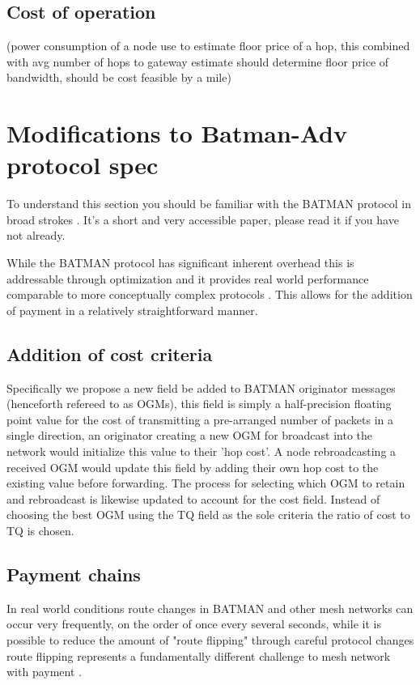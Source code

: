 \documentclass[11pt]{article}
\begin{document}
    \subsection{Cost of operation}

    (power consumption of a node use to estimate floor price of a hop, this combined with avg number of hops to gateway estimate should determine floor price of bandwidth, should be cost feasible by a mile)

\section{Modifications to Batman-Adv protocol spec}

	To understand this section you should be familiar with the BATMAN protocol in broad strokes \cite{batman}. It's a short and very accessible paper, please read it if you have not already.

	While the BATMAN protocol has significant inherent overhead this is addressable through optimization \cite{catwoman, batroam} and it provides real world performance comparable to more conceptually complex protocols \cite{meshperf}. This allows for the addition of payment in a relatively straightforward manner.

	\subsection{Addition of cost criteria}

		Specifically we propose a new field be added to BATMAN originator messages (henceforth refereed to as OGMs), this field is simply a half-precision floating point value for the cost of transmitting a pre-arranged number of packets in a single direction, an originator creating a new OGM for broadcast into the network would initialize this value to their 'hop cost'. A node rebroadcasting a received OGM would update this field by adding their own hop cost to the existing value before forwarding.
	The process for selecting which OGM to retain and rebroadcast is likewise updated to account for the cost field. Instead of choosing the best OGM using the TQ field as the sole criteria the ratio of cost to TQ is chosen.

	\subsection{Payment chains}

        In real world conditions route changes in BATMAN and other mesh networks can occur very frequently, on the order of once every several seconds, while it is possible to reduce the amount of "route flipping" through careful protocol changes route flipping represents a fundamentally different challenge to mesh network with payment \cite{meshflip}.
\end{document}
